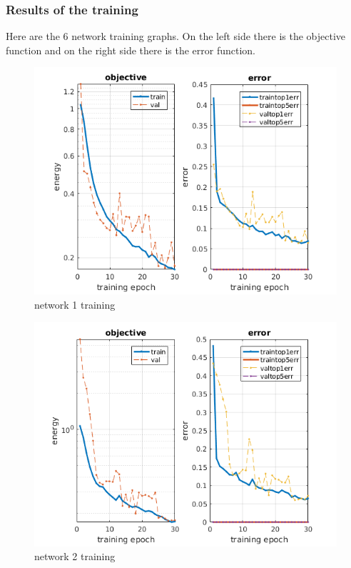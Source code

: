 \documentclass{beamer}
\begin{document}
\begin{frame}

\frametitle{Results of the training}
Here are the 6 network training graphs. On the left side there is the objective function and on the right side there is the error function.

\begin{figure}[h]
	\begin{center}
		\includegraphics[scale=0.5]{init_1.png}
		\caption{network 1 training}
		\label{fig:training1}
	\end{center}
\end{figure}

\end{frame}



\begin{frame}

\begin{figure}[h]
	\begin{center}
		\includegraphics[scale=0.5]{init_2.png}
		\caption{network 2 training}
		\label{fig:training2}
	\end{center}
\end{figure}

\end{frame}
\end{document}
